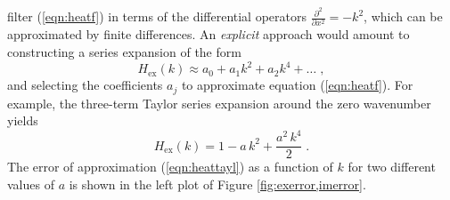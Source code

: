 filter (\ref{eqn:heatf}) in terms of the differential operators
$\frac{\partial^2}{\partial x^2} = - k^2$, which can be approximated
by finite differences. An \emph{explicit} approach would amount to
constructing a series expansion of the form
\begin{equation}
  \label{eqn:heatexpl}
  H_{\mbox{ex}} (k) \approx a_0 + a_1 k^2 + a_2 k^4 + \ldots\;,
\end{equation}
and selecting the coefficients $a_j$ to approximate equation
(\ref{eqn:heatf}). For example, the three-term Taylor series expansion
around the zero wavenumber yields
\begin{equation}
  \label{eqn:heattayl}
  H_{\mbox{ex}} (k) = 1 - a\,{k^2}  +
  {\frac{{{a }^2}\,{k^4}}{2}} \;.
\end{equation}
The error of approximation (\ref{eqn:heattayl}) as a function of $k$
for two different values of $a$ is shown in the left plot of Figure
\ref{fig:exerror,imerror}.


